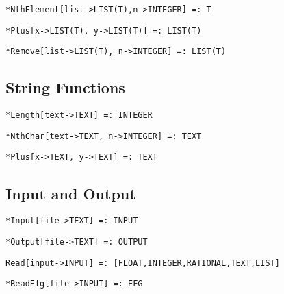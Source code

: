 \protect \large \begin{verbatim}
*NthElement[list->LIST(T),n->INTEGER] =: T 
\end{verbatim}\normalsize

\protect \large \begin{verbatim}
*Plus[x->LIST(T), y->LIST(T)] =: LIST(T)
\end{verbatim}\normalsize

\protect \large \begin{verbatim}
*Remove[list->LIST(T), n->INTEGER] =: LIST(T)
\end{verbatim}\normalsize


\medskip
\subsection{String Functions}

\protect \large \begin{verbatim}
*Length[text->TEXT] =: INTEGER
\end{verbatim}\normalsize

\protect \large \begin{verbatim}
*NthChar[text->TEXT, n->INTEGER] =: TEXT
\end{verbatim}\normalsize

\protect \large \begin{verbatim}
*Plus[x->TEXT, y->TEXT] =: TEXT
\end{verbatim} \normalsize



\medskip
\subsection{Input and Output}


\protect \large \begin{verbatim}
*Input[file->TEXT] =: INPUT
\end{verbatim}\normalsize

\protect \large \begin{verbatim}
*Output[file->TEXT] =: OUTPUT
\end{verbatim}\normalsize

\protect \large \begin{verbatim}
Read[input->INPUT] =: [FLOAT,INTEGER,RATIONAL,TEXT,LIST]
\end{verbatim}\normalsize

\protect \large \begin{verbatim}
*ReadEfg[file->INPUT] =: EFG
\end{verbatim}\normalsize


